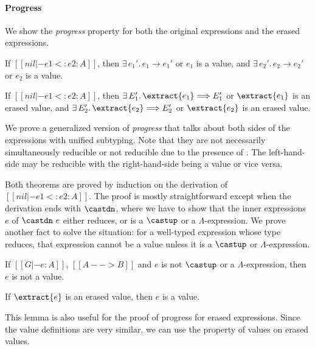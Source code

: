 \paragraph{Progress} We show the \emph{progress} property for both
the original expressions and the erased expressions.

\begin{theorem}
    If $[[nil |- e1 <: e2 : A]]$,
    then $\exists \, e_1'. \, e_1 \longrightarrow e_1'$ or $e_1$ is a value,
    and $\exists \, e_2'. \, e_2 \longrightarrow e_2'$ or $e_2$ is a value.
\end{theorem}

\begin{theorem}
    If $[[nil |- e1 <: e2 : A]]$,
    then $\exists \, E_1'. \, \extract{e_1} \Longrightarrow E_1'$ or $\extract{e_1}$ is an erased value,
    and $\exists \, E_2'. \, \extract{e_2} \Longrightarrow E_2'$ or $\extract{e_2}$ is an erased value.
\end{theorem}

\noindent We prove a generalized version of \emph{progress} that talks about both sides
of the expressions with unified subtyping. Note that they are not necessarily
simultaneously reducible or not reducible due to the presence of .
The left-hand-side may be reducible with the right-hand-side being a value or vice versa.

Both theorems are proved by induction on the derivation of $[[nil |- e1 <: e2 : A]]$.
The proof is mostly straightforward except when the derivation ends with $\castdn$,
where we have to show that the inner expressions $e$ of $\castdn~e$ either reduces, or
is a $\castup$ or a $\Lambda$-expression. We prove another fact to solve the situation:
for a well-typed expression whose type reduces, that expression
cannot be a value unless it is a $\castup$ or $\Lambda$-expression.

\begin{lemma}
    If $[[G |- e : A]]$, $[[A --> B]]$ and $e$ is not $\castup$ or a $\Lambda$-expression,
    then $e$ is not a value.
\end{lemma}

\begin{lemma}
    If $\extract{e}$ is an erased value, then $e$ is a value.
\end{lemma}

This lemma is also useful for the proof of progress for erased expressions.
Since the value definitions are very similar, we can use the property of values
on erased values.

